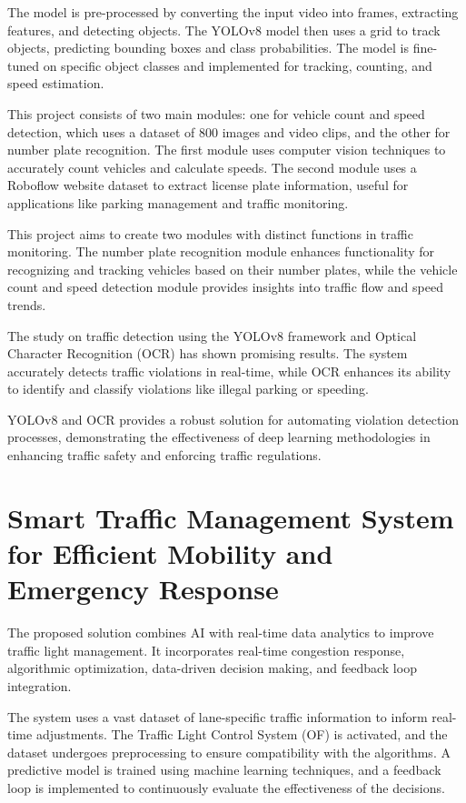 The model is pre-processed by converting the input video into frames, extracting features, and detecting objects. The YOLOv8 model then uses a grid to track objects, predicting bounding boxes and class probabilities. The model is fine-tuned on specific object classes and implemented for tracking, counting, and speed estimation.

This project consists of two main modules: one for vehicle count and speed detection, which uses a dataset of 800 images and video clips, and the other for number plate recognition. The first module uses computer vision techniques to accurately count vehicles and calculate speeds. The second module uses a Roboflow website dataset to extract license plate information, useful for applications like parking management and traffic monitoring. 

This project aims to create two modules with distinct functions in traffic monitoring. The number plate recognition module enhances functionality for recognizing and tracking vehicles based on their number plates, while the vehicle count and speed detection module provides insights into traffic flow and speed trends.

The study on traffic detection using the YOLOv8 framework and Optical Character Recognition (OCR) has shown promising results. The system accurately detects traffic violations in real-time, while OCR enhances its ability to identify and classify violations like illegal parking or speeding.

YOLOv8 and OCR provides a robust solution for automating violation detection processes, demonstrating the effectiveness of deep learning methodologies in enhancing traffic safety and enforcing traffic regulations.


\section{Smart Traffic Management System for Efficient Mobility and Emergency Response \cite{paper_4}}
The proposed solution combines AI with real-time data analytics to improve traffic light management. It incorporates real-time congestion response, algorithmic optimization, data-driven decision making, and feedback loop integration. 

The system uses a vast dataset of lane-specific traffic information to inform real-time adjustments. The Traffic Light Control System (OF) is activated, and the dataset undergoes preprocessing to ensure compatibility with the algorithms. A predictive model is trained using machine learning techniques, and a feedback loop is implemented to continuously evaluate the effectiveness of the decisions. 

